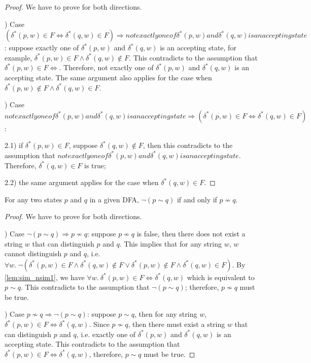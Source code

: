\begin{proof}
\noindent We have to prove for both directions. 

\par {}) Case \((\delta^*(p,w) \in F \Leftrightarrow
\delta^*(q,w) \in F) \Rightarrow not
exactly one of \delta^*(p,w) and \delta^*(q,w) is
an accepting state\): suppose exactly one of \(\delta^*(p,w)\) and
\(\delta^*(q,w)\) is an accepting state, for example, \(\delta^*(p,w)
\in F \wedge \delta^*(q,w) \notin F\). This contradicts to the
assumption that \(\delta^*(p,w) \in F \Leftrightarrow\). Therefore, not
exactly one of \(\delta^*(p,w)\) and \(\delta^*(q,w)\) is
an accepting state. The same argument also applies for the case when \(\delta^*(p,w)
\notin F \wedge \delta^*(q,w) \in F\).

\par {}) Case \(not
exactly one of \delta^*(p,w) and \delta^*(q,w) is
an accepting state \Rightarrow (\delta^*(p,w) \in F \Leftrightarrow
\delta^*(q,w) \in F)\): 
\par 2.1) if \(\delta^*(p,w) \in F\), suppose \(\delta^*(q,w) \notin
F\), then this contradicts to the assumption that \(not
exactly one of \delta^*(p,w) and \delta^*(q,w) is
an accepting state\). Therefore, \(\delta^*(q,w) \in F\) is true;
\par 2.2) the same argument applies for the case when \(\delta^*(q,w) \in F\).
\end{proof}


\begin{lem}
\label{lem:sim_nsim}
\noindent For any two states \(p\) and \(q\) in a given DFA, \(\neg (p
\sim q)\) if and only if \(p \nsim q\). 
\end{lem}

\begin{proof}
\noindent We have to prove for both directions.

\par {}) Case \(\neg (p \sim q) \Rightarrow p \nsim
q\): suppose \(p \nsim q\) is false, then there does not exist a
string \(w\) that can distinguish \(p\) and \(q\). This implies that for any string \(w\), \(w\) cannot
distinguish \(p\) and \(q\), i.e. \(\forall w.\ \neg (\delta^*(p,w) \in F \wedge \delta^*(q,w) \notin F \vee
\delta^*(p,w) \notin F \wedge \delta^*(q,w) \in F)\). By
\autoref{lem:sim_nsim1}, we have \(\forall w.\ \delta^*(p,w) \in F
\Leftrightarrow \delta^*(q,w)\) which is equivalent to \(p \sim
q\). This contradicts to the assumption that \(\neg (p \sim q)\);
therefore, \(p \nsim q\) must be true. 

\par {}) Case \(p \nsim q \Rightarrow \neg (p \sim q)\): suppose \(p \sim q\), then for any string \(w\),
\(\delta^*(p,w) \in F \Leftrightarrow \delta^*(q,w)\). Since \(p \nsim
q\), then there must exist a string \(w\)
that can distinguish \(p\) and \(q\), i.e. exactly one of
\(\delta^*(p,w)\) and \(\delta^*(q,w)\) is an accepting state. This
contradicts to the assumption that \(\delta^*(p,w) \in F
\Leftrightarrow \delta^*(q,w)\), therefore, \(p \sim q\) must be true. 
\end{proof}

